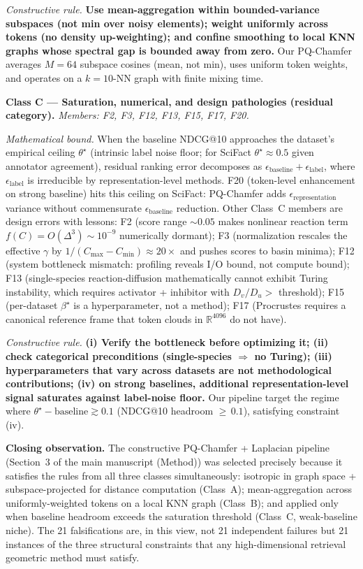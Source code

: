 \documentclass[review,1p,11pt]{elsarticle}
\newcommand{\R}{\mathbb{R}}
\begin{document}
\noindent\emph{Constructive rule.} \textbf{Use mean-aggregation within bounded-variance subspaces (not min over noisy elements); weight uniformly across tokens (no density up-weighting); and confine smoothing to local KNN graphs whose spectral gap is bounded away from zero.} Our PQ-Chamfer averages $M=64$ subspace cosines (mean, not min), uses uniform token weights, and operates on a $k=10$-NN graph with finite mixing time.

\textbf{Class C --- Saturation, numerical, and design pathologies (residual category).} \emph{Members: F2, F3, F12, F13, F15, F17, F20.}

\noindent\emph{Mathematical bound.} When the baseline NDCG@10 approaches the dataset's empirical ceiling $\theta^\star$ (intrinsic label noise floor; for SciFact $\theta^\star \approx 0.5$ given annotator agreement), residual ranking error decomposes as $\epsilon_{\mathrm{baseline}} + \epsilon_{\mathrm{label}}$, where $\epsilon_{\mathrm{label}}$ is irreducible by representation-level methods. F20 (token-level enhancement on strong baseline) hits this ceiling on SciFact: PQ-Chamfer adds $\epsilon_{\mathrm{representation}}$ variance without commensurate $\epsilon_{\mathrm{baseline}}$ reduction. Other Class~C members are design errors with lessons: F2 (score range $\sim 0.05$ makes nonlinear reaction term $f(C) = O(\Delta^3) \sim 10^{-9}$ numerically dormant); F3 (normalization rescales the effective $\gamma$ by $1/(C_{\max}-C_{\min}) \approx 20\times$ and pushes scores to basin minima); F12 (system bottleneck mismatch: profiling reveals I/O bound, not compute bound); F13 (single-species reaction-diffusion mathematically cannot exhibit Turing instability, which requires activator + inhibitor with $D_v/D_u >$ threshold); F15 (per-dataset $\beta^\star$ is a hyperparameter, not a method); F17 (Procrustes requires a canonical reference frame that token clouds in $\R^{4096}$ do not have).

\noindent\emph{Constructive rule.} \textbf{(i) Verify the bottleneck before optimizing it; (ii) check categorical preconditions (single-species $\Rightarrow$ no Turing); (iii) hyperparameters that vary across datasets are not methodological contributions; (iv) on strong baselines, additional representation-level signal saturates against label-noise floor.} Our pipeline target the regime where $\theta^\star - \mathrm{baseline} \gtrsim 0.1$ (NDCG@10 headroom ${\geq}\,0.1$), satisfying constraint (iv).

\textbf{Closing observation.} The constructive PQ-Chamfer + Laplacian pipeline (Section~3 of the main manuscript (Method)) was selected precisely because it satisfies the rules from all three classes simultaneously: isotropic in graph space + subspace-projected for distance computation (Class~A); mean-aggregation across uniformly-weighted tokens on a local KNN graph (Class~B); and applied only when baseline headroom exceeds the saturation threshold (Class~C, weak-baseline niche). The 21 falsifications are, in this view, not 21 independent failures but 21 instances of the three structural constraints that any high-dimensional retrieval geometric method must satisfy.
\end{document}

